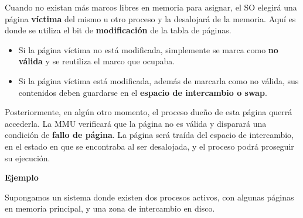 \documentclass[spanish,A4,]{article}
\begin{document}
Cuando no existan más marcos libres en memoria para asignar, el SO
elegirá una página \textbf{víctima} del mismo u otro proceso y la
desalojará de la memoria. Aquí es donde se utiliza el bit de
\textbf{modificación} de la tabla de páginas.

\begin{itemize}
\itemsep1pt\parskip0pt
\item
  Si la página víctima no está modificada, simplemente se marca como
  \textbf{no válida} y se reutiliza el marco que ocupaba.
\item
  Si la página víctima está modificada, además de marcarla como no
  válida, sus contenidos deben guardarse en el \textbf{espacio de
  intercambio o swap}.
\end{itemize}

Posteriormente, en algún otro momento, el proceso dueño de esta página
querrá accederla. La MMU verificará que la página no es válida y
disparará una condición de \textbf{fallo de página}. La página será
traída del espacio de intercambio, en el estado en que se encontraba al
ser desalojada, y el proceso podrá proseguir su ejecución.

\textbf{Ejemplo}

Supongamos un sistema donde existen dos procesos activos, con algunas
páginas en memoria principal, y una zona de intercambio en disco.
\end{document}
